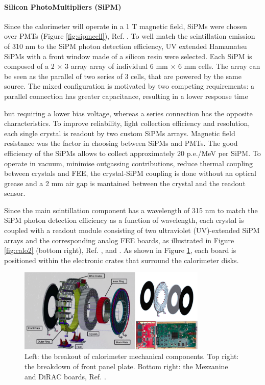 \paragraph{Silicon PhotoMultipliers (SiPM)}
Since the calorimeter will operate in a 1 T magnetic field, SiPMs were chosen over PMTs (Figure \ref{fig:sipmcell}), Ref. \cite{em1}. 
To well match the scintillation emission of 310 nm to the SiPM photon detection efficiency, 
UV extended Hamamatsu SiPMs with a front window made of a silicon resin were selected. Each SiPM is composed of a
2 $\times$ 3 array array of individual 6 mm $\times$ 6 mm cells.
The array can be seen as the parallel of two series of 3 cells, that 
are powered by the same source. The mixed configuration is motivated by 
two competing requirements: a parallel connection has {\red greater capacitance, 
  resulting in a lower response time}

but requiring a lower bias voltage, whereas 
a series connection has the opposite characteristics. 
To improve reliability, light collection efficiency and resolution, each single 
crystal is readout by two custom SiPMs arrays.
Magnetic field resistance was the factor in choosing between SiPMs and PMTs.
The good efficiency of the SiPMs allows to collect approximately 20 p.e./MeV per SiPM.
To operate in vacuum, minimise outgassing contributions, reduce 
thermal coupling between crystals and FEE, the crystal-SiPM 
coupling is done without an optical grease and a 2 mm air gap is mantained 
between the crystal and the readout sensor.

Since the main scintillation component has a wavelength of 315 nm to match the SiPM
photon detection efficiency as a function of wavelength, each crystal is coupled with a readout 
module consisting of two ultraviolet (UV)-extended SiPM arrays
and the corresponding analog FEE boards, as illustrated in Figure 
\ref{fig:calo2} (bottom right), Ref. \cite{em5}, \cite{em2} and \cite{em3}. 
As shown in Figure \ref{fig:calo3}, each board is positioned within the electronic 
crates that surround the calorimeter disks.
\begin{figure}[!h]
        \centering
        \includegraphics[width =0.8\textwidth]{figures/png/Screenshot_20240322_121017.png}
        \caption[The breakout of calorimeter mechanical components.]{Left: the breakout of calorimeter mechanical components. Top right: the breakdown of front
        panel plate. Bottom right: the Mezzanine and DiRAC boards, Ref. \cite{em4}.}
        \label{fig:calo3}
        \end{figure}


